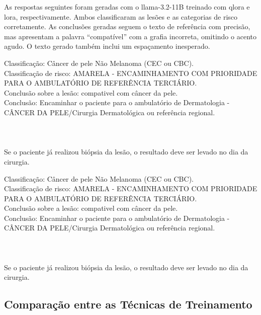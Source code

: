 As respostas seguintes foram geradas com o \ac{llama}-3.2-11B treinado com \ac{qlora} e \ac{lora}, respectivamente.
Ambos classificaram as lesões e as categorias de risco corretamente. As conclusões geradas seguem o texto de referência
com precisão, mas apresentam a palavra ``compatível'' com a grafia incorreta, omitindo o acento agudo. O texto gerado
também inclui um espaçamento inesperado.

\begin{dialogue}
     Classificação: Câncer de pele Não Melanoma (CEC ou CBC). \\
    Classificação de risco: AMARELA - ENCAMINHAMENTO COM PRIORIDADE PARA O AMBULATÓRIO DE REFERÊNCIA TERCIÁRIO. \\
    Conclusão sobre a lesão: compativel com câncer da pele. \\
    Conclusão: Encaminhar o paciente para o ambulatório de Dermatologia - CÂNCER DA PELE/Cirurgia Dermatológica ou
    referência regional. \\ \\ \\ \\
    Se o paciente já realizou biópsia da lesão, o resultado deve ser levado no dia da cirurgia.
\end{dialogue}

\begin{dialogue}
     Classificação: Câncer de pele Não Melanoma (CEC ou CBC). \\
    Classificação de risco: AMARELA - ENCAMINHAMENTO COM PRIORIDADE PARA O AMBULATÓRIO DE REFERÊNCIA TERCIÁRIO. \\
    Conclusão sobre a lesão: compativel com câncer da pele. \\
    Conclusão: Encaminhar o paciente para o ambulatório de Dermatologia - CÂNCER DA PELE/Cirurgia Dermatológica ou
    referência regional. \\ \\ \\ \\
    Se o paciente já realizou biópsia da lesão, o resultado deve ser levado no dia da cirurgia.
\end{dialogue}

\subsection{Comparação entre as Técnicas de Treinamento}

